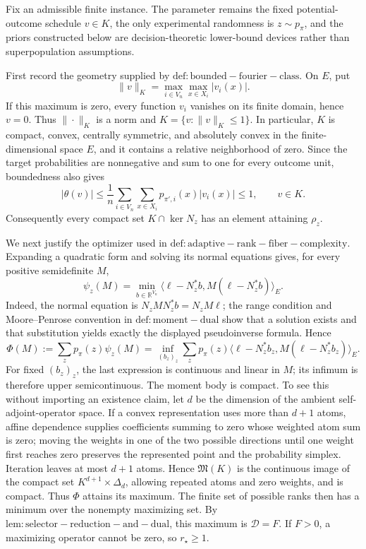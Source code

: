 Fix an admissible finite instance. The parameter remains the fixed potential-outcome schedule \(v\in K\), the only experimental randomness is \(z\sim p_{\pi}\), and the priors constructed below are decision-theoretic lower-bound devices rather than superpopulation assumptions.

First record the geometry supplied by \(\mathrm{def:bounded-fourier-class}\). On \(E\), put
\[
 \|v\|_K=\max_{i\in V_n}\max_{x\in X_i}|v_i(x)|.
\]
If this maximum is zero, every function \(v_i\) vanishes on its finite domain, hence \(v=0\). Thus \(\|\cdot\|_K\) is a norm and \(K=\{v:\|v\|_K\le1\}\). In particular, \(K\) is compact, convex, centrally symmetric, and absolutely convex in the finite-dimensional space \(E\), and it contains a relative neighborhood of zero. Since the target probabilities are nonnegative and sum to one for every outcome unit, boundedness also gives
\[
 |\theta(v)|
 \le \frac1n\sum_{i\in V_n}\sum_{x\in X_i}p_{\pi',i}(x)|v_i(x)|
 \le1,
 \qquad v\in K.
\]
Consequently every compact set \(K\cap\ker N_z\) has an element attaining \(\rho_z\).

We next justify the optimizer used in \(\mathrm{def:adaptive-rank-fiber-complexity}\). Expanding a quadratic form and solving its normal equations gives, for every positive semidefinite \(M\),
\[
 \psi_z(M)
 =\min_{b\in\mathbb R^{V_n}}
 \langle\ell-N_z^{\ast}b,M(\ell-N_z^{\ast}b)\rangle_E.
\]
Indeed, the normal equation is \(N_zMN_z^{\ast}b=N_zM\ell\); the range condition and Moore--Penrose convention in \(\mathrm{def:moment-dual}\) show that a solution exists and that substitution yields exactly the displayed pseudoinverse formula. Hence
\[
 \Phi(M):=\sum_zp_{\pi}(z)\psi_z(M)
 =\inf_{(b_z)_z}\sum_zp_{\pi}(z)
 \langle\ell-N_z^{\ast}b_z,M(\ell-N_z^{\ast}b_z)\rangle_E.
\]
For fixed \((b_z)_z\), the last expression is continuous and linear in \(M\); its infimum is therefore upper semicontinuous. The moment body is compact. To see this without importing an existence claim, let \(d\) be the dimension of the ambient self-adjoint-operator space. If a convex representation uses more than \(d+1\) atoms, affine dependence supplies coefficients summing to zero whose weighted atom sum is zero; moving the weights in one of the two possible directions until one weight first reaches zero preserves the represented point and the probability simplex. Iteration leaves at most \(d+1\) atoms. Hence \(\mathfrak M(K)\) is the continuous image of the compact set \(K^{d+1}\times\Delta_d\), allowing repeated atoms and zero weights, and is compact. Thus \(\Phi\) attains its maximum. The finite set of possible ranks then has a minimum over the nonempty maximizing set. By \(\mathrm{lem:selector-reduction-and-dual}\), this maximum is \(\mathcal D=F\). If \(F>0\), a maximizing operator cannot be zero, so \(r_{\star}\ge1\).

